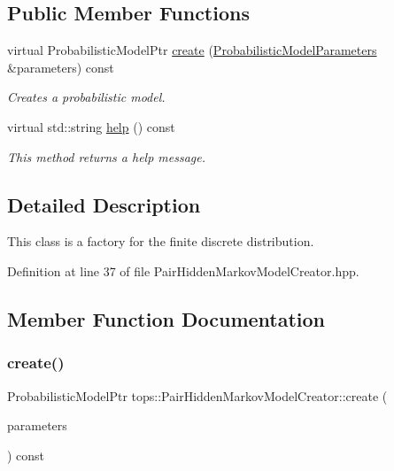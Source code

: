 \subsection*{Public Member Functions}
\begin{DoxyCompactItemize}
\item 
virtual Probabilistic\+Model\+Ptr \hyperlink{classtops_1_1PairHiddenMarkovModelCreator_aa426cbbbcd7af43cd92f62d71e30b129}{create} (\hyperlink{classtops_1_1ProbabilisticModelParameters}{Probabilistic\+Model\+Parameters} \&parameters) const
\begin{DoxyCompactList}\small\item\em Creates a probabilistic model. \end{DoxyCompactList}\item 
\mbox{\label{classtops_1_1PairHiddenMarkovModelCreator_affd03df40a34c7b04d17e952c07b2e29}} 
virtual std\+::string \hyperlink{classtops_1_1PairHiddenMarkovModelCreator_affd03df40a34c7b04d17e952c07b2e29}{help} () const
\begin{DoxyCompactList}\small\item\em This method returns a help message. \end{DoxyCompactList}\end{DoxyCompactItemize}


\subsection{Detailed Description}
This class is a factory for the finite discrete distribution. 

Definition at line 37 of file Pair\+Hidden\+Markov\+Model\+Creator.\+hpp.



\subsection{Member Function Documentation}
\mbox{\label{classtops_1_1PairHiddenMarkovModelCreator_aa426cbbbcd7af43cd92f62d71e30b129}} 
\subsubsection{\texorpdfstring{create()}{create()}}
{\footnotesize\ttfamily Probabilistic\+Model\+Ptr tops\+::\+Pair\+Hidden\+Markov\+Model\+Creator\+::create (\begin{DoxyParamCaption}\item[{\hyperlink{classtops_1_1ProbabilisticModelParameters}{Probabilistic\+Model\+Parameters} \&}]{parameters }\end{DoxyParamCaption}) const\hspace{0.3cm}{\ttfamily [virtual]}}



